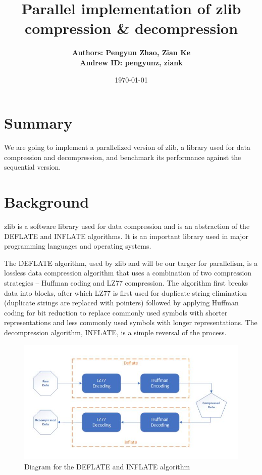 \documentclass{article}
\title{Parallel implementation of zlib compression \& decompression}
\author{\textbf{Authors: Pengyun Zhao, Zian Ke}\\\textbf{Andrew ID: pengyunz, ziank}}
\date{\today}
\begin{document}
\maketitle

\section{Summary}
We are going to implement a parallelized version of zlib, a library used for data compression and decompression, and benchmark its performance against the sequential version.

\section{Background}
zlib is a software library used for data compression and is an abstraction of the DEFLATE and INFLATE algorithms. It is an important library used in major programming languages and operating systems. 

\noindent The DEFLATE algorithm, used by zlib and will be our targer for parallelism, is a lossless data compression algorithm that uses a combination of two compression strategies -- Huffman coding and LZ77 compression. The algorithm first breaks data into blocks, after which LZ77 is first used for duplicate string elimination (duplicate strings are replaced with pointers) followed by applying Huffman coding for bit reduction to replace commonly used symbols with shorter representations and less commonly used symbols with longer representations. The decompression algorithm, INFLATE, is a simple reversal of the process.
\begin{figure}[!h]
\begin{center}
    \includegraphics[height = 6cm]{Diagram.JPG}
    \caption{Diagram for the DEFLATE and INFLATE algorithm}
\end{center}
\end{figure}
\end{document}
